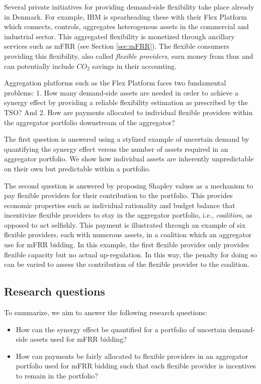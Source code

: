 \documentclass[lettersize,journal]{IEEEtran}
\begin{document}
Several private initiatives for providing demand-side flexibility take place already in Denmark. For example, IBM is spearheading these with their Flex Platform which connects, controls, aggregates heterogenous assets in the commercial and industrial sector. This aggregated flexibility is monetized through ancillary services such as mFRR (see Section \ref{sec:mFRR}). The flexible consumers providing this flexibility, also called \textit{flexible providers}, earn money from thus and can potentially include $CO_{2}$ savings in their accounting.

Aggregation platforms such as the Flex Platform faces two fundamental problems: 1. How many demand-side assets are needed in order to achieve a synergy effect by providing a reliable flexibility estimation as prescribed by the TSO? And 2. How are payments allocated to individual flexible providers within the aggregator portfolio downstream of the aggregator?

The first question is answered using a stylized example of uncertain demand by quantifying the synergy effect versus the number of assets required in an aggregator portfolio. We show how individual assets are inherently unpredictable on their own but predictable within a portfolio.

The second question is answered by proposing Shapley values \cite{shapley1997value} as a mechanism to pay flexible providers for their contribution to the portfolio. This provides economic properties such as individual rationality and budget balance that incentivize flexible providers to stay in the aggregator portfolio, i.e., \textit{coalition}, as opposed to act selfishly. This payment is illustrated through an example of six flexible providers, each with numerous assets, in a coalition which an aggregator use for mFRR bidding. In this example, the first flexible provider only provides flexible capacity but no actual up-regulation. In this way, the penalty for doing so can be varied to assess the contribution of the flexible provider to the coalition.

\subsection{Research questions}

To summarize, we aim to answer the following research questions:

\begin{itemize}
    \item How can the synergy effect be quantified for a portfolio of uncertain demand-side assets used for mFRR bidding?
    \item How can payments be fairly allocated to flexible providers in an aggregator portfolio used for mFRR bidding such that each flexible provider is incentives to remain in the portfolio?
\end{itemize}
\end{document}
